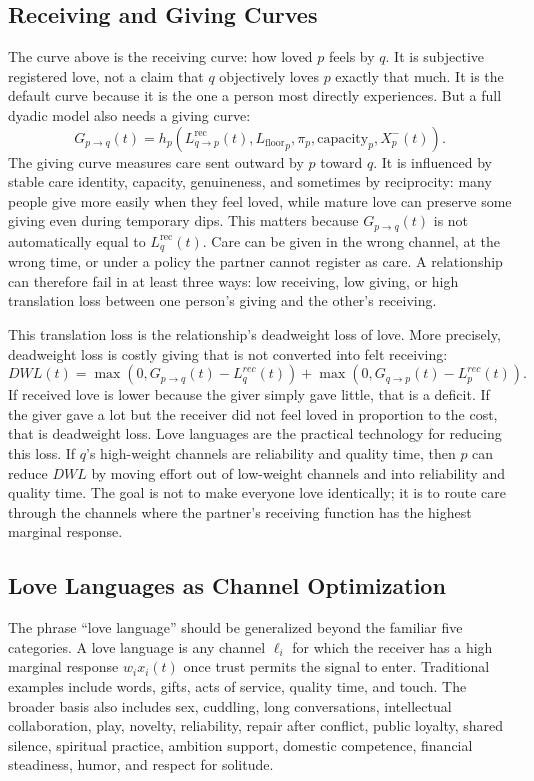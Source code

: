 \documentclass[11pt]{article}
\newcommand{\Lfloor}{L_{\mathrm{floor}}}
\begin{document}
\subsection{Receiving and Giving Curves}
The curve above is the receiving curve: how loved $p$ feels by $q$. It is subjective registered love, not a claim that $q$ objectively loves $p$ exactly that much. It is the default curve because it is the one a person most directly experiences. But a full dyadic model also needs a giving curve:
\begin{equation}
G_{p\rightarrow q}(t)=h_p\left(L_{q\rightarrow p}^{\mathrm{rec}}(t),{\Lfloor}_p,\pi_p,\mathrm{capacity}_p,X_p^-(t)\right).
\end{equation}
The giving curve measures care sent outward by $p$ toward $q$. It is influenced by stable care identity, capacity, genuineness, and sometimes by reciprocity: many people give more easily when they feel loved, while mature love can preserve some giving even during temporary dips. This matters because $G_{p\rightarrow q}(t)$ is not automatically equal to $L_q^{\mathrm{rec}}(t)$. Care can be given in the wrong channel, at the wrong time, or under a policy the partner cannot register as care. A relationship can therefore fail in at least three ways: low receiving, low giving, or high translation loss between one person's giving and the other's receiving.

This translation loss is the relationship's deadweight loss of love. More precisely, deadweight loss is costly giving that is not converted into felt receiving:
\begin{equation}
DWL(t)=\max(0,G_{p\rightarrow q}(t)-L_q^{rec}(t))+\max(0,G_{q\rightarrow p}(t)-L_p^{rec}(t)).
\end{equation}
If received love is lower because the giver simply gave little, that is a deficit. If the giver gave a lot but the receiver did not feel loved in proportion to the cost, that is deadweight loss. Love languages are the practical technology for reducing this loss. If $q$'s high-weight channels are reliability and quality time, then $p$ can reduce $DWL$ by moving effort out of low-weight channels and into reliability and quality time. The goal is not to make everyone love identically; it is to route care through the channels where the partner's receiving function has the highest marginal response.

\subsection{Love Languages as Channel Optimization}
The phrase ``love language'' should be generalized beyond the familiar five categories. A love language is any channel $\ell_i$ for which the receiver has a high marginal response $w_i x_i(t)$ once trust permits the signal to enter. Traditional examples include words, gifts, acts of service, quality time, and touch. The broader basis also includes sex, cuddling, long conversations, intellectual collaboration, play, novelty, reliability, repair after conflict, public loyalty, shared silence, spiritual practice, ambition support, domestic competence, financial steadiness, humor, and respect for solitude.
\end{document}
